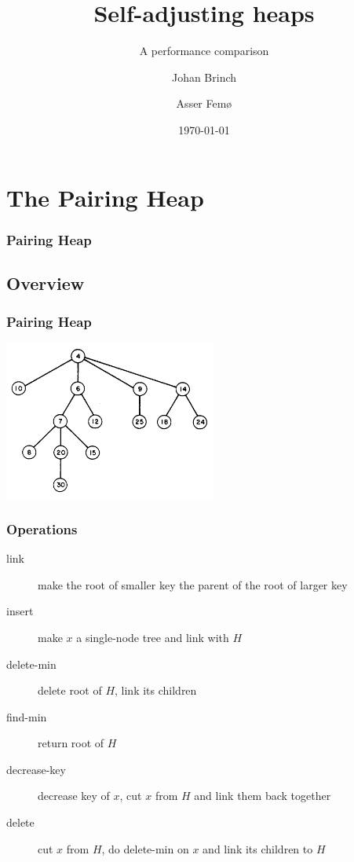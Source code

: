 \documentclass{beamer}
\title{Self-adjusting heaps}
\subtitle{A performance comparison}
\author{Johan Brinch \and Asser Femø}
\date{\today}
\begin{document}
\lstset{basicstyle=\footnotesize\ttfamily}
\begin{frame}
  \titlepage
\end{frame}

\section{The Pairing Heap}

\begin{frame}[fragile]
\frametitle{Pairing Heap}
\tableofcontents
\end{frame}

\subsection{Overview}
\begin{frame}[fragile]
\frametitle{Pairing Heap}

\begin{center}
\includegraphics[width=7cm]{../pairing-heap-slides/fig1.png}
\end{center}

\end{frame}

\begin{frame}
\frametitle{Operations}

\begin{description}
\item[link] make the root of smaller key the parent of the root of larger key
\item[insert] make $x$ a single-node tree and link with $H$
\item[delete-min] delete root of $H$, link its children
\item[find-min] return root of $H$
\item[decrease-key] decrease key of $x$, cut $x$ from $H$ and link them
back together
\item[delete] cut $x$ from $H$, do delete-min on $x$ and link its children to $H$
\end{description}

\end{frame}
\end{document}
